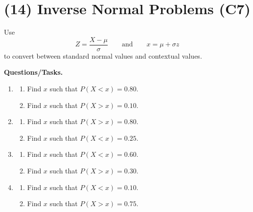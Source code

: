 	
	\section{(14) Inverse Normal Problems (C7)}
	\label{sec:inverse-normal-problems-c7}
	
	Use
	\[
	Z=\frac{X-\mu}{\sigma}
	\qquad \text{and} \qquad
	x=\mu+\sigma z
	\]
	to convert between standard normal values and contextual values.
	
	\textbf{Questions/Tasks.}
	\begin{enumerate}[label=\textbf{\arabic*)}]
		\item {}
		\begin{enumerate}[label=\textbf{\alph*)}]
			\item Find \(x\) such that \(P(X<x)=0.80\).
			\item Find \(x\) such that \(P(X>x)=0.10\).
		\end{enumerate}
		
		\item {}
		\begin{enumerate}[label=\textbf{\alph*)}]
			\item Find \(x\) such that \(P(X>x)=0.80\).
			\item Find \(x\) such that \(P(X<x)=0.25\).
		\end{enumerate}
		
		\item {}
		\begin{enumerate}[label=\textbf{\alph*)}]
			\item Find \(x\) such that \(P(X<x)=0.60\).
			\item Find \(x\) such that \(P(X>x)=0.30\).
		\end{enumerate}
		
		\item {}
		\begin{enumerate}[label=\textbf{\alph*)}]
			\item Find \(x\) such that \(P(X<x)=0.10\).
			\item Find \(x\) such that \(P(X>x)=0.75\).
		\end{enumerate}
		

\end{enumerate}
